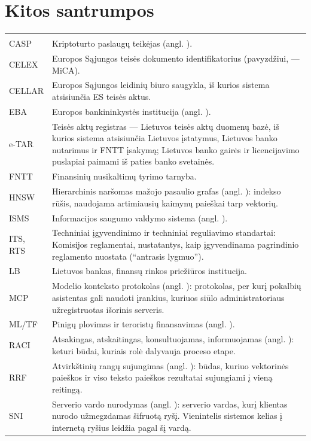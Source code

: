 \section{Kitos santrumpos}\label{sec:glossary:other}

\begin{xltabular}{\textwidth}{@{}L{24mm}Y@{}}
\toprule
{} &  \\
\midrule
\endfirsthead
\toprule
{} &  \\
\midrule
\endhead
\bottomrule
\endlastfoot
CASP & Kriptoturto paslaugų teikėjas (angl. ). \\
CELEX & Europos Sąjungos teisės dokumento identifikatorius (pavyzdžiui,  ---
  MiCA). \\
CELLAR & Europos Sąjungos leidinių biuro saugykla, iš kurios sistema atsisiunčia ES teisės
  aktus. \\
EBA & Europos bankininkystės institucija (angl. ). \\
e-TAR & Teisės aktų registras --- Lietuvos teisės aktų duomenų bazė, iš kurios sistema atsisiunčia
  Lietuvos įstatymus, Lietuvos banko nutarimus ir FNTT įsakymą; Lietuvos banko gairės ir
  licencijavimo puslapiai paimami iš paties banko svetainės. \\
FNTT & Finansinių nusikaltimų tyrimo tarnyba. \\
HNSW & Hierarchinis naršomas mažojo pasaulio grafas (angl. ): indekso rūšis, naudojama artimiausių kaimynų paieškai tarp vektorių. \\
ISMS & Informacijos saugumo valdymo sistema (angl. ). \\
ITS, RTS & Techniniai įgyvendinimo ir techniniai reguliavimo standartai: Komisijos reglamentai,
  nustatantys, kaip įgyvendinama pagrindinio reglamento nuostata (\enquote{antrasis lygmuo}). \\
LB & Lietuvos bankas, finansų rinkos priežiūros institucija. \\
MCP & Modelio konteksto protokolas (angl. ): protokolas, per kurį
  pokalbių asistentas gali naudoti įrankius, kuriuos siūlo administratoriaus užregistruotas
  išorinis serveris. \\
ML/TF & Pinigų plovimas ir teroristų finansavimas (angl. ). \\
RACI & Atsakingas, atskaitingas, konsultuojamas, informuojamas (angl. ): keturi būdai, kuriais rolė dalyvauja proceso etape. \\
RRF & Atvirkštinių rangų sujungimas (angl. ): būdas, kuriuo vektorinės
  paieškos ir viso teksto paieškos rezultatai sujungiami į vieną reitingą. \\
SNI & Serverio vardo nurodymas (angl. ): serverio
  vardas, kurį klientas nurodo užmegzdamas šifruotą ryšį. Vienintelis sistemos kelias į
  internetą ryšius leidžia pagal šį vardą. \\
\end{xltabular}
